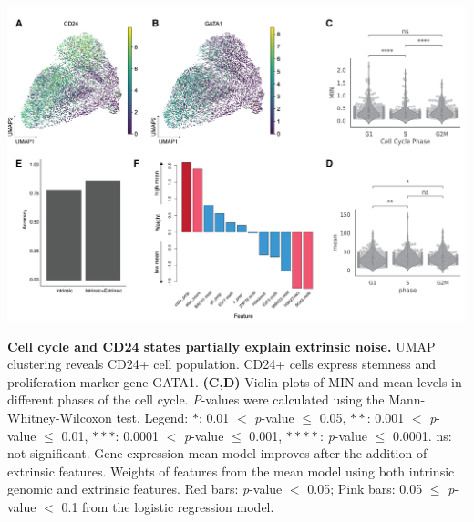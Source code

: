 \begin{suppfigure}[p]  
    \centering
    \includegraphics[width=\linewidth]{figures/cas/cas_suppfigure5.png}
    \caption[Cell cycle and CD24 states partially explain extrinsic noise.]{
        \textbf{Cell cycle and CD24 states partially explain extrinsic noise.}
        UMAP clustering reveals CD24+ cell population.
        CD24+ cells express stemness and proliferation marker gene GATA1.
        \textbf{(C,D)}
        Violin plots of MIN  and mean  levels in different phases of the cell cycle. \textit{P}-values were calculated using the Mann-Whitney-Wilcoxon test. Legend: $\ast$: 0.01 $<$ \textit{p}-value $\leq$ 0.05, $\ast\ast$: 0.001 $<$ \textit{p}-value $\leq$ 0.01, $\ast\ast\ast$: 0.0001 $<$ \textit{p}-value $\leq$ 0.001, $\ast\ast\ast\ast$: \textit{p}-value $\leq$ 0.0001. ns: not significant.
        Gene expression mean model improves after the addition of extrinsic features.
        Weights of features from the mean model using both intrinsic genomic and extrinsic features. Red bars: \textit{p}-value $<$ 0.05; Pink bars: 0.05 $\leq$ \textit{p}-value $<$ 0.1 from the logistic regression model. 
    }
    \label{fig:cas_figureS5}
\end{suppfigure}

